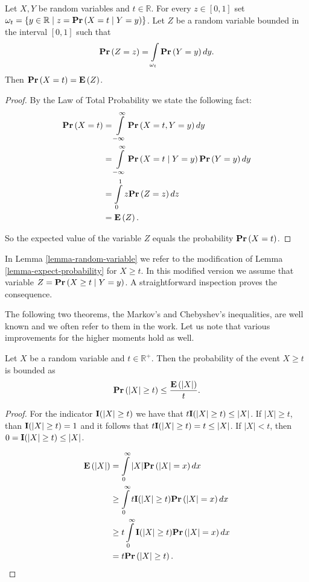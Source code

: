 \begin{lemma}
\label{lemma-expect-probability}
Let $X, Y$ be random variables and $t \in \mathbb{R}$. For every $z \in [0, 1]$ set $\omega_t = \{y \in \mathbb{R} \mid z = \mathbf{Pr}\left(X = t \mid Y = y\right) \}$. Let $Z$ be a random variable bounded in the interval $[0, 1]$ such that \[\mathbf{Pr}\left(Z = z\right) = \int\limits_{\omega_t} \mathbf{Pr}\left(Y = y\right) dy \text{.} \] Then $\mathbf{Pr}\left(X = t\right) = \mathbf{E}\left(Z\right)$.
\end{lemma}
\begin{proof}
By the Law of Total Probability we state the following fact:
\[
\begin{split}
\mathbf{Pr}\left(X = t\right) 
	& = \int\limits_{-\infty}^{\infty} \mathbf{Pr}\left(X = t, Y = y\right) dy \\
	& = \int\limits_{-\infty}^{\infty} \mathbf{Pr}\left(X = t \mid Y = y\right) \mathbf{Pr}\left(Y = y\right) dy \\
	& = \int\limits_{0}^{1} z \mathbf{Pr}\left(Z = z\right) dz \\
	& = \mathbf{E}\left(Z\right) \text{.}
\end{split}
\]

So the expected value of the variable $Z$ equals the probability $\mathbf{Pr}\left(X = t\right)$.
\end{proof}

In Lemma \ref{lemma-random-variable} we refer to the modification of Lemma \ref{lemma-expect-probability} for $X \geq t$. In this modified version we assume that variable $Z = \mathbf{Pr}\left(X \geq t \mid Y = y\right)$. A straightforward inspection proves the consequence.

The following two theorems, the Markov's \cite{557945} and Chebyshev's \cite{pFEL66a} inequalities, are well known and we often refer to them in the work. Let us note that various improvements for the higher moments hold as well.
\begin{theorem}
\label{theorem-markov-inequality}
Let $X$ be a random variable and $t \in \mathbb{R}^{+}$. Then the probability of the event $X \geq t$ is bounded as
\[
\mathbf{Pr}\left(|X| \geq t\right) \leq \frac{\mathbf{E}\left(|X|\right)}{t} \text{.}
\]
\end{theorem}
\begin{proof}
For the indicator $\mathbf{I}(|X| \geq t)$ we have that $t\mathbf{I}(|X| \geq t) \leq |X|$. If $|X| \geq t$, than $\mathbf{I}(|X| \geq t) = 1$ and it follows that $t\mathbf{I}(|X| \geq t) = t \leq |X|$. If $|X| < t$, then $0 = \mathbf{I}(|X| \geq t) \leq |X|$.

\[
\begin{split}
\mathbf{E}\left(|X|\right) 
	& = \int\limits_{0}^{\infty} |X| \mathbf{Pr}\left(|X| = x\right) dx \\
	& \geq \int\limits_{0}^{\infty} t \mathbf{I}(|X| \geq t) \mathbf{Pr}\left(|X| = x\right) dx \\
	& \geq t \int\limits_{0}^{\infty} \mathbf{I}(|X| \geq t) \mathbf{Pr}\left(|X| = x\right) dx \\
	& = t \mathbf{Pr}\left(|X| \geq t\right) \text{.}
\end{split}
\]
\end{proof}

